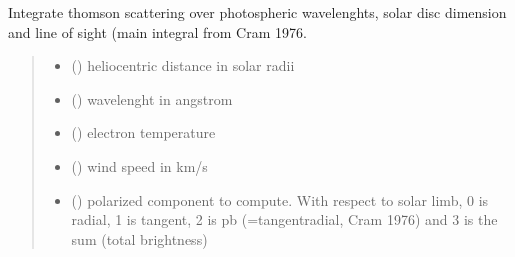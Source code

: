 \documentclass[letterpaper,10pt,english]{sphinxmanual}
\begin{document}
\begin{fulllineitems}
\label{\detokenize{doppler_dimming_lib:doppler_dimming_lib.integrals.integrated_I_s}}
\pysigstartsignatures
{}
\pysigstopsignatures
\sphinxAtStartPar
Integrate thomson scattering over photospheric wavelenghts, solar disc dimension and line of sight (main integral from Cram 1976.
\begin{quote}\begin{description}
\begin{itemize}
\item {} 
\sphinxAtStartPar
{} () \textendash{} heliocentric distance in solar radii

\item {} 
\sphinxAtStartPar
{} () \textendash{} wavelenght in angstrom

\item {} 
\sphinxAtStartPar
{} () \textendash{} electron temperature

\item {} 
\sphinxAtStartPar
{} () \textendash{} wind speed in km/s

\item {} 
\sphinxAtStartPar
{} () \textendash{} polarized component to compute. With respect to solar limb, 0 is radial, 1 is tangent, 2 is pb (=tangent\sphinxhyphen{}radial, Cram 1976) and 3 is the sum (total brightness)


\end{itemize}
\end{description}
\end{quote}
\end{fulllineitems}
\end{document}
